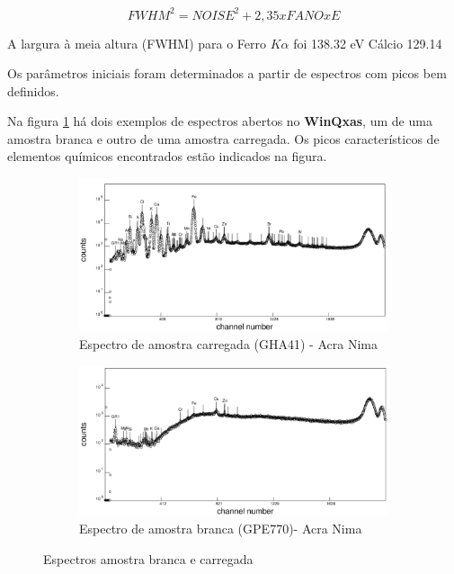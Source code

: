 \begin{equation}
  \label{eq:fwhm}
   FWHM^2 = NOISE^2 + 2,35 x FANO  x E
\end{equation}

A largura à meia altura (FWHM) para o Ferro $K\alpha$ foi 138.32 eV
Cálcio 129.14

Os parâmetros iniciais foram determinados a partir de espectros com picos bem definidos.

Na figura \ref{fig:winqxas} há dois exemplos de espectros abertos no \textbf{WinQxas}, 
um de uma amostra branca e outro de uma amostra carregada. 
Os picos característicos de elementos químicos encontrados estão indicados na figura.

\begin{figure}[H]
  \centering
  \begin{subfigure}[b]{0.7\textwidth}
    \includegraphics[width=\textwidth]{../inputs/images/winqxas/GHA41editado.pdf}
    \caption{Espectro de amostra carregada (GHA41) - Acra Nima}
  \end{subfigure}
  \begin{subfigure}[b]{0.7\textwidth}
    \includegraphics[width=\textwidth]{../inputs/images/winqxas/GPE770editado.pdf}
     \caption{Espectro de amostra branca (GPE770)- Acra Nima}
  \end{subfigure}
  \caption{Espectros amostra branca e carregada \label{fig:winqxas}}
\end{figure}


